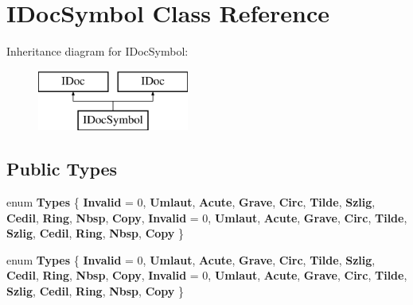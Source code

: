 \hypertarget{class_i_doc_symbol}{}\section{I\+Doc\+Symbol Class Reference}
\label{class_i_doc_symbol}
Inheritance diagram for I\+Doc\+Symbol\+:\begin{figure}[H]
\begin{center}
\leavevmode
\includegraphics[height=2.000000cm]{class_i_doc_symbol}
\end{center}
\end{figure}
\subsection*{Public Types}
\begin{DoxyCompactItemize}
\item 
\mbox{\label{class_i_doc_symbol_aaf2e0ad5f92964ff52017b23714c59f0}} 
enum {\bfseries Types} \{ \newline
{\bfseries Invalid} = 0, 
{\bfseries Umlaut}, 
{\bfseries Acute}, 
{\bfseries Grave}, 
\newline
{\bfseries Circ}, 
{\bfseries Tilde}, 
{\bfseries Szlig}, 
{\bfseries Cedil}, 
\newline
{\bfseries Ring}, 
{\bfseries Nbsp}, 
{\bfseries Copy}, 
{\bfseries Invalid} = 0, 
\newline
{\bfseries Umlaut}, 
{\bfseries Acute}, 
{\bfseries Grave}, 
{\bfseries Circ}, 
\newline
{\bfseries Tilde}, 
{\bfseries Szlig}, 
{\bfseries Cedil}, 
{\bfseries Ring}, 
\newline
{\bfseries Nbsp}, 
{\bfseries Copy}
 \}
\item 
\mbox{\label{class_i_doc_symbol_aaf2e0ad5f92964ff52017b23714c59f0}} 
enum {\bfseries Types} \{ \newline
{\bfseries Invalid} = 0, 
{\bfseries Umlaut}, 
{\bfseries Acute}, 
{\bfseries Grave}, 
\newline
{\bfseries Circ}, 
{\bfseries Tilde}, 
{\bfseries Szlig}, 
{\bfseries Cedil}, 
\newline
{\bfseries Ring}, 
{\bfseries Nbsp}, 
{\bfseries Copy}, 
{\bfseries Invalid} = 0, 
\newline
{\bfseries Umlaut}, 
{\bfseries Acute}, 
{\bfseries Grave}, 
{\bfseries Circ}, 
\newline
{\bfseries Tilde}, 
{\bfseries Szlig}, 
{\bfseries Cedil}, 
{\bfseries Ring}, 
\newline
{\bfseries Nbsp}, 
{\bfseries Copy}
 \}
\end{DoxyCompactItemize}
